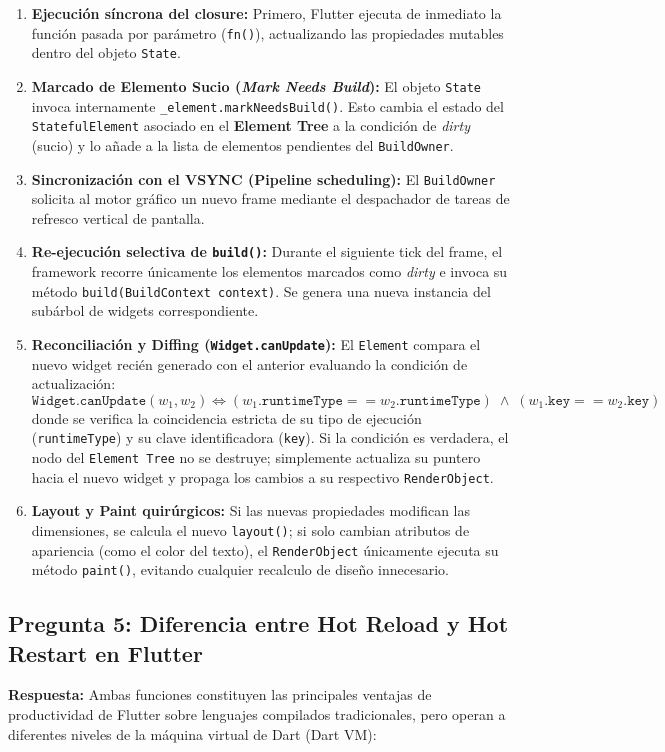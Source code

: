 \documentclass[12pt,a4paper]{article}
\begin{document}
\begin{enumerate}
    \item \textbf{Ejecución síncrona del closure:} Primero, Flutter ejecuta de inmediato la función pasada por parámetro (\texttt{fn()}), actualizando las propiedades mutables dentro del objeto \texttt{State}.
    \item \textbf{Marcado de Elemento Sucio (\textit{Mark Needs Build}):} El objeto \texttt{State} invoca internamente \texttt{\_element.markNeedsBuild()}. Esto cambia el estado del \texttt{StatefulElement} asociado en el \textbf{Element Tree} a la condición de \textit{dirty} (sucio) y lo añade a la lista de elementos pendientes del \texttt{BuildOwner}.
    \item \textbf{Sincronización con el VSYNC (Pipeline scheduling):} El \texttt{BuildOwner} solicita al motor gráfico un nuevo frame mediante el despachador de tareas de refresco vertical de pantalla.
    \item \textbf{Re-ejecución selectiva de \texttt{build()}:} Durante el siguiente tick del frame, el framework recorre únicamente los elementos marcados como \textit{dirty} e invoca su método \texttt{build(BuildContext context)}. Se genera una nueva instancia del subárbol de widgets correspondiente.
    \item \textbf{Reconciliación y Diffing (\texttt{Widget.canUpdate}):} El \texttt{Element} compara el nuevo widget recién generado con el anterior evaluando la condición de actualización:
    \[
      \mathtt{Widget.canUpdate}(w_1, w_2) \iff (w_1.\mathtt{runtimeType} == w_2.\mathtt{runtimeType}) \;\land\; (w_1.\mathtt{key} == w_2.\mathtt{key})
    \]
    donde se verifica la coincidencia estricta de su tipo de ejecución (\texttt{runtimeType}) y su clave identificadora (\texttt{key}).
    Si la condición es verdadera, el nodo del \texttt{Element Tree} no se destruye; simplemente actualiza su puntero hacia el nuevo widget y propaga los cambios a su respectivo \texttt{RenderObject}.
    \item \textbf{Layout y Paint quirúrgicos:} Si las nuevas propiedades modifican las dimensiones, se calcula el nuevo \texttt{layout()}; si solo cambian atributos de apariencia (como el color del texto), el \texttt{RenderObject} únicamente ejecuta su método \texttt{paint()}, evitando cualquier recalculo de diseño innecesario.
\end{enumerate}

\subsection{Pregunta 5: Diferencia entre Hot Reload y Hot Restart en Flutter}
\textbf{Respuesta:}
Ambas funciones constituyen las principales ventajas de productividad de Flutter sobre lenguajes compilados tradicionales, pero operan a diferentes niveles de la máquina virtual de Dart (Dart VM):
\end{document}
